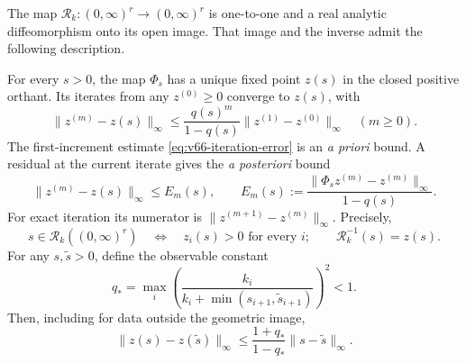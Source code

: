 \begin{theorem}\label{thm:v66-curvature}
The map $\mathcal R_k:(0,\infty)^r\longrightarrow(0,\infty)^r$
is one-to-one and a real analytic diffeomorphism onto its open image.
That image and the inverse admit the following description.

For every $s>0$, the map $\Phi_s$ has a unique fixed point $z(s)$ in
the closed positive orthant.  Its iterates from any $z^{(0)}\ge0$
converge to $z(s)$, with
\begin{equation}\label{eq:v66-iteration-error}
 \|z^{(m)}-z(s)\|_\infty
 \le \frac{q(s)^m}{1-q(s)}
                    \|z^{(1)}-z^{(0)}\|_\infty\quad(m\ge0).
\end{equation}
The first-increment estimate \eqref{eq:v66-iteration-error} is an
\emph{a priori} bound.  A residual at the current iterate gives the
\emph{a posteriori} bound
\begin{equation}\label{eq:v67-residual-error}
 \|z^{(m)}-z(s)\|_\infty\le E_m(s),\qquad
 E_m(s):=\frac{\|\Phi_s z^{(m)}-z^{(m)}\|_\infty}{1-q(s)}.
\end{equation}
For exact iteration its numerator is
$\|z^{(m+1)}-z^{(m)}\|_\infty$.
Precisely,
\begin{equation}\label{eq:v66-image}
 s\in\mathcal R_k((0,\infty)^r)
       \quad\Longleftrightarrow\quad z_i(s)>0\text{ for every }i;
 \qquad \mathcal R_k^{-1}(s)=z(s).
\end{equation}
For any $s,\widetilde s>0$, define the observable constant
\[
 q_* = \max_i
 \left(\frac{k_i}{k_i+\min(s_{i+1},\widetilde s_{i+1})}\right)^2<1.
\]
Then, including for data outside the geometric image,
\begin{equation}\label{eq:v66-pair-lipschitz}
 \|z(s)-z(\widetilde s)\|_\infty
       \le\frac{1+q_*}{1-q_*}\|s-\widetilde s\|_\infty.
\end{equation}
\end{theorem}
